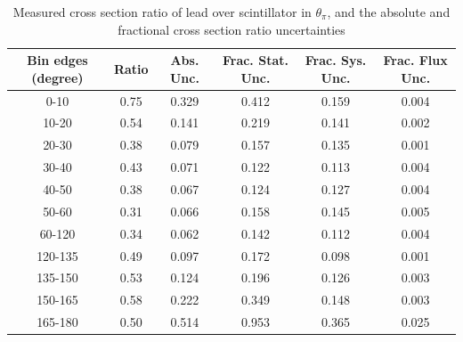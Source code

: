 \documentclass[../main.tex]{subfiles}
\begin{document}
\begin{table}
  \centering
  \renewcommand{\arraystretch}{1.15}
  \caption{Measured cross section ratio of lead over scintillator in $\theta_{\pi}$, and the absolute and fractional cross section ratio uncertainties}
    \begin{tabular}{c||c|c||c|c|c}
      Bin edges (degree) &  Ratio  &  Abs. Unc.  &  Frac. Stat. Unc.  &  Frac. Sys. Unc.  &  Frac. Flux Unc. \\
      \hline
      \hline
      0-10 & 0.75 & 0.329 & 0.412 & 0.159 & 0.004\\
      10-20 & 0.54 & 0.141 & 0.219 & 0.141 & 0.002\\
      20-30 & 0.38 & 0.079 & 0.157 & 0.135 & 0.001\\
      30-40 & 0.43 & 0.071 & 0.122 & 0.113 & 0.004\\
      40-50 & 0.38 & 0.067 & 0.124 & 0.127 & 0.004\\
      50-60 & 0.31 & 0.066 & 0.158 & 0.145 & 0.005\\
      60-120 & 0.34 & 0.062 & 0.142 & 0.112 & 0.004\\
      120-135 & 0.49 & 0.097 & 0.172 & 0.098 & 0.001\\
      135-150 & 0.53 & 0.124 & 0.196 & 0.126 & 0.003\\
      150-165 & 0.58 & 0.222 & 0.349 & 0.148 & 0.003\\
      165-180 & 0.50 & 0.514 & 0.953 & 0.365 & 0.025
    \end{tabular}
  \label{tbl:rationucleonnuc82pion_thetaa}
\end{table}
\pagebreak
\end{document}
